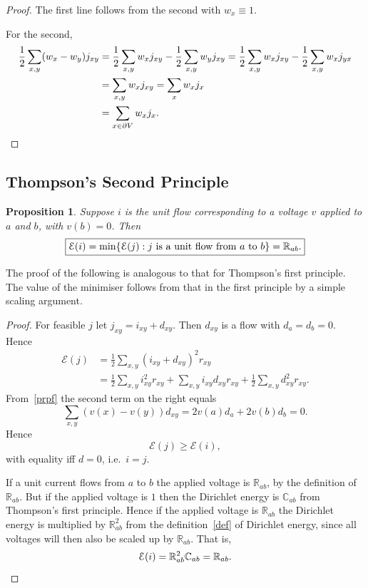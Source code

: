 \documentclass[a4paper]{amsart}
\theoremstyle{plain}
\newtheorem{proposition}[theorem]{Proposition}
\theoremstyle{definition}
\theoremstyle{remark}
\begin{document}
\begin{proof} The first line follows from the second with $ w_x \equiv 1 $. 

For the second,
\begin{align*} 
\frac{1}{2} \sum_{x,y} (w_x - w_y) j_{xy} &
      =  \frac{1}{2}  \sum_{x,y} w_x j_{xy} -  \frac{1}{2}  \sum_{x,y} w_y j_{xy}  
    =  \frac{1}{2}  \sum_{x,y} w_x j_{xy} -   \frac{1}{2} \sum_{x,y} w_x j_{yx}  \\
 &=  \sum_{x,y} w_x j_{xy}  
   =   \sum_x w_x j_x \\ &=   \sum_{x\in \partial V} w_x j_x. \qedhere
  \end{align*}  
\end{proof} 

\subsection{Thompson's Second Principle} 

\begin{proposition} Suppose $ i $ is the unit flow corresponding to a voltage $ v $ applied to $ a $ and $ b $, with $ v(b) = 0 $.  Then 
\begin{equation} \label{} 
\boxed{\mathcal{E}(i) = \min \{ \mathcal{E}(j) :   j \text{ is a unit flow from $ a $ to $ b $}\} = \mathbb{R}_{ab}.}
\end{equation} 
\end{proposition}

The proof of the following is analogous to that for Thompson's first principle. The value of the minimiser follows from that in the first principle by a simple scaling argument.

\begin{proof}
 For feasible $ j $ let $ j_{xy} = i_{xy} + d_{xy}$.  Then $ d_{xy} $ is a flow with $d_a =d_b = 0 $.
Hence
\begin{align*}
\mathcal{E}(j) &= \frac{1}{2} \sum_{x,y} (i_{xy} + d_{xy})^2 r_{xy} \\
   &= \frac{1}{2} \sum_{x,y} i^2_{xy}r_{xy} + \sum_{x,y}i_{xy} d_{xy} r_{xy} + \frac{1}{2} \sum_{x,y}d_{xy}^2r_{xy}.
   \end{align*}
From~\eqref{prpf} the second term on the right equals
\[ 
\sum_{x,y} (v(x)-v(y)) d_{xy} = 2v(a)  d_a + 2v(b) d_b =0.
\]
Hence 
\[
\mathcal{E}(j) \geq \mathcal{E}(i),
\]
with equality iff $ d = 0 $, i.e.\ $ i=j $.

\medskip

If a unit current flows from $ a $ to $ b $ the applied voltage is $  \mathbb{R}_{ab} $, by the definition of $\mathbb{R}_{ab} $. 
But if the applied voltage is $ 1 $ then the Dirichlet energy is $  \mathbb{C}_{ab} $ from Thompson's first principle.  
Hence if the applied  voltage is $ \mathbb{R}_{ab}  $   the Dirichlet energy is multiplied by $  \mathbb{R}_{ab} ^2 $  from the definition~\eqref{def} of Dirichlet energy, since all voltages will then also be scaled up by $ \mathbb{R}_{ab}  $.
That is, 
\[ \mathcal{E}(i) = \mathbb{R}_{ab}^2 \mathbb{C}_{ab} = \mathbb{R}_{ab} .
\qedhere 
\]
\end{proof} 
\end{document}
